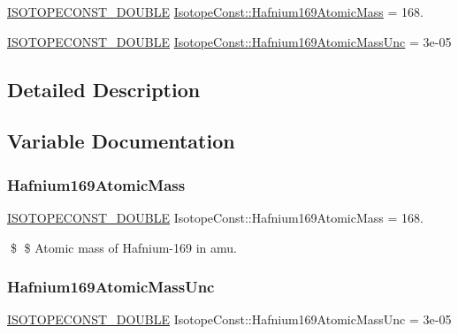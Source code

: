 \begin{DoxyCompactItemize}
\item 
\mbox{\hyperlink{group___isotope_const-_macros_ga8f45a7272ce02c0b4c65c44636ed719a}{I\+S\+O\+T\+O\+P\+E\+C\+O\+N\+S\+T\+\_\+\+D\+O\+U\+B\+LE}} \mbox{\hyperlink{group___isotope_const-_hafnium-_hf169_ga11608325b321596140fd1b2d87556d22}{Isotope\+Const\+::\+Hafnium169\+Atomic\+Mass}} = 168.
\item 
\mbox{\hyperlink{group___isotope_const-_macros_ga8f45a7272ce02c0b4c65c44636ed719a}{I\+S\+O\+T\+O\+P\+E\+C\+O\+N\+S\+T\+\_\+\+D\+O\+U\+B\+LE}} \mbox{\hyperlink{group___isotope_const-_hafnium-_hf169_gacfcdc82ef2045014d54a615957154753}{Isotope\+Const\+::\+Hafnium169\+Atomic\+Mass\+Unc}} = 3e-\/05
\end{DoxyCompactItemize}


\subsection{Detailed Description}


\subsection{Variable Documentation}
\mbox{\label{group___isotope_const-_hafnium-_hf169_ga11608325b321596140fd1b2d87556d22}} 
\subsubsection{\texorpdfstring{Hafnium169\+Atomic\+Mass}{Hafnium169AtomicMass}}
{\footnotesize\ttfamily \mbox{\hyperlink{group___isotope_const-_macros_ga8f45a7272ce02c0b4c65c44636ed719a}{I\+S\+O\+T\+O\+P\+E\+C\+O\+N\+S\+T\+\_\+\+D\+O\+U\+B\+LE}} Isotope\+Const\+::\+Hafnium169\+Atomic\+Mass = 168.}

\$ \$ Atomic mass of Hafnium-\/169 in amu. \mbox{\label{group___isotope_const-_hafnium-_hf169_gacfcdc82ef2045014d54a615957154753}} 
\subsubsection{\texorpdfstring{Hafnium169\+Atomic\+Mass\+Unc}{Hafnium169AtomicMassUnc}}
{\footnotesize\ttfamily \mbox{\hyperlink{group___isotope_const-_macros_ga8f45a7272ce02c0b4c65c44636ed719a}{I\+S\+O\+T\+O\+P\+E\+C\+O\+N\+S\+T\+\_\+\+D\+O\+U\+B\+LE}} Isotope\+Const\+::\+Hafnium169\+Atomic\+Mass\+Unc = 3e-\/05}

